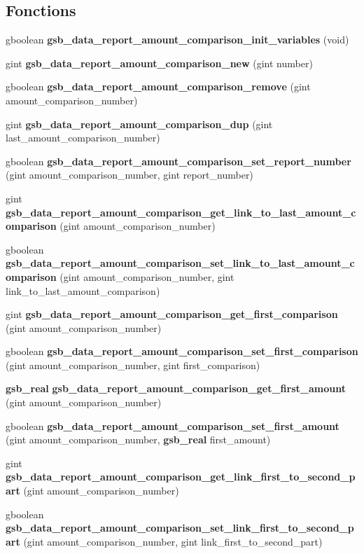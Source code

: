 \subsection*{Fonctions}
\begin{DoxyCompactItemize}
\item 
gboolean {\bf gsb\_\-data\_\-report\_\-amount\_\-comparison\_\-init\_\-variables} (void)
\item 
gint {\bf gsb\_\-data\_\-report\_\-amount\_\-comparison\_\-new} (gint number)
\item 
gboolean {\bf gsb\_\-data\_\-report\_\-amount\_\-comparison\_\-remove} (gint amount\_\-comparison\_\-number)
\item 
gint {\bf gsb\_\-data\_\-report\_\-amount\_\-comparison\_\-dup} (gint last\_\-amount\_\-comparison\_\-number)
\item 
gboolean {\bf gsb\_\-data\_\-report\_\-amount\_\-comparison\_\-set\_\-report\_\-number} (gint amount\_\-comparison\_\-number, gint report\_\-number)
\item 
gint {\bf gsb\_\-data\_\-report\_\-amount\_\-comparison\_\-get\_\-link\_\-to\_\-last\_\-amount\_\-comparison} (gint amount\_\-comparison\_\-number)
\item 
gboolean {\bf gsb\_\-data\_\-report\_\-amount\_\-comparison\_\-set\_\-link\_\-to\_\-last\_\-amount\_\-comparison} (gint amount\_\-comparison\_\-number, gint link\_\-to\_\-last\_\-amount\_\-comparison)
\item 
gint {\bf gsb\_\-data\_\-report\_\-amount\_\-comparison\_\-get\_\-first\_\-comparison} (gint amount\_\-comparison\_\-number)
\item 
gboolean {\bf gsb\_\-data\_\-report\_\-amount\_\-comparison\_\-set\_\-first\_\-comparison} (gint amount\_\-comparison\_\-number, gint first\_\-comparison)
\item 
{\bf gsb\_\-real} {\bf gsb\_\-data\_\-report\_\-amount\_\-comparison\_\-get\_\-first\_\-amount} (gint amount\_\-comparison\_\-number)
\item 
gboolean {\bf gsb\_\-data\_\-report\_\-amount\_\-comparison\_\-set\_\-first\_\-amount} (gint amount\_\-comparison\_\-number, {\bf gsb\_\-real} first\_\-amount)
\item 
gint {\bf gsb\_\-data\_\-report\_\-amount\_\-comparison\_\-get\_\-link\_\-first\_\-to\_\-second\_\-part} (gint amount\_\-comparison\_\-number)
\item 
gboolean {\bf gsb\_\-data\_\-report\_\-amount\_\-comparison\_\-set\_\-link\_\-first\_\-to\_\-second\_\-part} (gint amount\_\-comparison\_\-number, gint link\_\-first\_\-to\_\-second\_\-part)

\end{DoxyCompactItemize}
